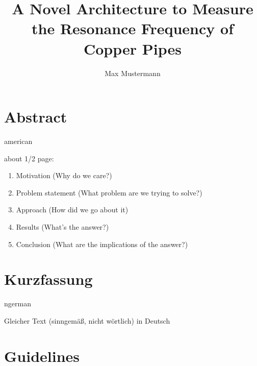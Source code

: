 \documentclass[]{ccs-thesis}
\author{Max Mustermann}
\title{A Novel Architecture to Measure the Resonance Frequency of Copper Pipes}
\begin{document}

\maketitle

\thispagestyle{empty}

\cleardoublepage


\chapter*{Abstract}
\begin{otherlanguage*}{american}

about 1/2 page:
\begin{enumerate}
	\item Motivation (Why do we care?)
	\item Problem statement (What problem are we trying to solve?)
	\item Approach (How did we go about it)
	\item Results (What's the answer?)
	\item Conclusion (What are the implications of the answer?)
\end{enumerate}

\end{otherlanguage*}


\chapter*{Kurzfassung}
\begin{otherlanguage*}{ngerman}

Gleicher Text (sinngemäß, nicht wörtlich) in Deutsch

\end{otherlanguage*}
\acresetall

\cleardoublepage
\tableofcontents
{}

\cleardoublepage
{}

\chapter{Guidelines}
\end{document}
